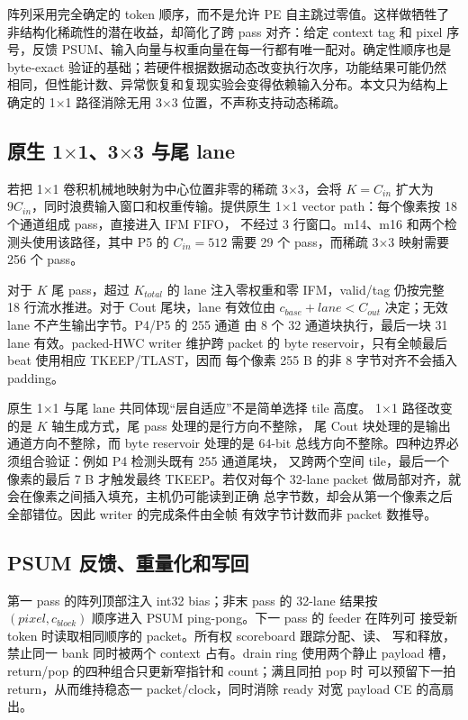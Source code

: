 阵列采用完全确定的 token 顺序，而不是允许 PE 自主跳过零值。这样做牺牲了
非结构化稀疏性的潜在收益，却简化了跨 pass 对齐：给定 context tag 和 pixel
序号，反馈 PSUM、输入向量与权重向量在每一行都有唯一配对。确定性顺序也是
byte-exact 验证的基础；若硬件根据数据动态改变执行次序，功能结果可能仍然
相同，但性能计数、异常恢复和复现实验会变得依赖输入分布。本文只为结构上
确定的 1$\times$1 路径消除无用 3$\times$3 位置，不声称支持动态稀疏。

\subsection{原生 1$\times$1、3$\times$3 与尾 lane}

若把 1$\times$1 卷积机械地映射为中心位置非零的稀疏 3$\times$3，会将
$K=C_{in}$ 扩大为 $9C_{in}$，同时浪费输入窗口和权重传输。\LASA 提供原生
1$\times$1 vector path：每个像素按 18 个通道组成 pass，直接进入 IFM FIFO，
不经过 3 行窗口。m14、m16 和两个检测头使用该路径，其中 P5 的
$C_{in}=512$ 需要 29 个 pass，而稀疏 3$\times$3 映射需要 256 个 pass。

对于 $K$ 尾 pass，超过 $K_{total}$ 的 lane 注入零权重和零 IFM，valid/tag
仍按完整 18 行流水推进。对于 Cout 尾块，lane 有效位由
$c_{base}+lane<C_{out}$ 决定；无效 lane 不产生输出字节。P4/P5 的 255 通道
由 8 个 32 通道块执行，最后一块 31 lane 有效。packed-HWC writer 维护跨
packet 的 byte reservoir，只有全帧最后 beat 使用相应 TKEEP/TLAST，因而
每个像素 255 B 的非 8 字节对齐不会插入 padding。

原生 1$\times$1 与尾 lane 共同体现“层自适应”不是简单选择 tile 高度。
1$\times$1 路径改变的是 $K$ 轴生成方式，尾 pass 处理的是行方向不整除，
尾 Cout 块处理的是输出通道方向不整除，而 byte reservoir 处理的是 64-bit
总线方向不整除。四种边界必须组合验证：例如 P4 检测头既有 255 通道尾块，
又跨两个空间 tile，最后一个像素的最后 7 B 才触发最终 TKEEP。若仅对每个
32-lane packet 做局部对齐，就会在像素之间插入填充，主机仍可能读到正确
总字节数，却会从第一个像素之后全部错位。因此 writer 的完成条件由全帧
有效字节计数而非 packet 数推导。

\subsection{PSUM 反馈、重量化和写回}

第一 pass 的阵列顶部注入 int32 bias；非末 pass 的 32-lane 结果按
$(pixel,c_{block})$ 顺序进入 PSUM ping-pong。下一 pass 的 feeder 在阵列可
接受新 token 时读取相同顺序的 packet。所有权 scoreboard 跟踪分配、读、
写和释放，禁止同一 bank 同时被两个 context 占有。drain ring 使用两个静止
payload 槽，return/pop 的四种组合只更新窄指针和 count；满且同拍 pop 时
可以预留下一拍 return，从而维持稳态一 packet/clock，同时消除 ready 对宽
payload CE 的高扇出。

